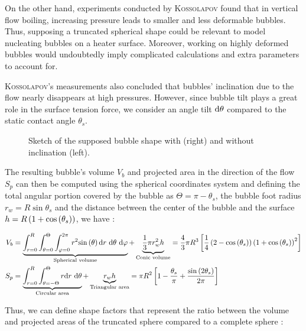 \npar
On the other hand, experiments conducted by \textsc{Kossolapov} found that in vertical flow boiling, increasing pressure leads to smaller and less deformable bubbles. Thus, supposing a truncated spherical shape could be relevant to model nucleating bubbles on a heater surface. Moreover, working on highly deformed bubbles would undoubtedly imply complicated calculations and extra parameters to account for.

\textsc{Kossolapov}'s measurements also concluded that bubbles' inclination due to the flow nearly disappears at high pressures. However, since bubble tilt plays a great role in the surface tension force, we consider an angle tilt $\mathrm{d}\theta$ compared to the static contact angle $\theta_{s}$.

\begin{figure}[h!]
\centering

\caption{Sketch of the supposed bubble shape with (right) and without inclination (left).}
\label{fig:bub_shape}

\end{figure}



The resulting bubble's volume $V_{b}$ and projected area in the direction of the flow $S_{p}$ can then be computed using the spherical coordinates system and defining the total angular portion covered by the bubble as $\Theta = \pi - \theta_{s}$, the bubble foot radius $r_{w}=R \sin{\theta_{s}}$ and the distance between the center of the bubble and the surface $h=R\left( 1+\mathrm{cos}\left( \theta_{s} \right) \right)$, we have :

\begin{align}
V_{b} &= \underbrace{ \int_{r=0}^{R} \int_{\theta=0}^{\Theta} \int_{\varphi=0}^{2\pi} r^{2}\mathrm{sin}\left( \theta \right) \text{d}r ~\text{d}\theta~ \text{d}\varphi }_{\text{Spherical volume}}+ \underbrace {\frac{1}{3}\pi r_{w}^{2}h}_{\text{Conic volume}}
=\frac{4}{3}\pi R^{3} \left[  \frac{1}{4} \left( 2-\mathrm{cos}\left( \theta_{s} \right) \right)\left( 1+\mathrm{cos}\left( \theta_{s} \right) \right)^{2}  \right] \\
S_{p}&= \underbrace{\int_{r=0}^{R}\int_{\theta=-\Theta}^{\Theta}r \text{d}r ~ \text{d}\theta}_{\text{Circular area}} + \underbrace{r_{w}h}_{\text{Triangular area}} = \pi R^{2} \left[ 1-\frac{\theta_{s}}{\pi} + \frac{\mathrm{sin}\left( 2\theta_{s} \right)}{2\pi}  \right] 
\end{align}


Thus, we can define shape factors that represent the ratio between the volume and projected areas of the truncated sphere compared to a complete sphere : 

